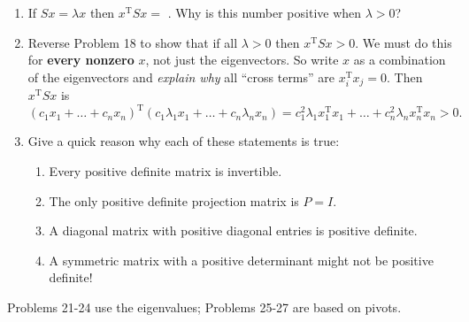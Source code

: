 \documentclass[14pt, a4paper]{article}
\begin{document}
\begin{enumerate}[resume]
    \item If $Sx = \lambda x$ then $x^{\mathrm{T}}Sx =$ \underline{\hspace{1cm}}. Why is this number positive when $\lambda > 0$?

    \item Reverse Problem 18 to show that if all $\lambda > 0$ then $x^{\mathrm{T}}Sx > 0$. We must do this for \textbf{every nonzero} $x$, not just the eigenvectors. So write $x$ as a combination of the eigenvectors and \textit{explain why} all ``cross terms'' are $x_i^{\mathrm{T}}x_j = 0$. Then $x^{\mathrm{T}}Sx$ is
          \[
              (c_1x_1 + \dots + c_nx_n)^{\mathrm{T}}(c_1\lambda_1x_1 + \dots + c_n\lambda_nx_n) = c_1^2\lambda_1x_1^{\mathrm{T}}x_1 + \dots + c_n^2\lambda_nx_n^{\mathrm{T}}x_n > 0.
          \]

    \item Give a quick reason why each of these statements is true:
          \begin{enumerate}
              \item Every positive definite matrix is invertible.
              \item The only positive definite projection matrix is $P = I$.
              \item A diagonal matrix with positive diagonal entries is positive definite.
              \item A symmetric matrix with a positive determinant might not be positive definite!
          \end{enumerate}
\end{enumerate}
\noindent Problems 21-24 use the eigenvalues; Problems 25-27 are based on pivots.
\end{document}
